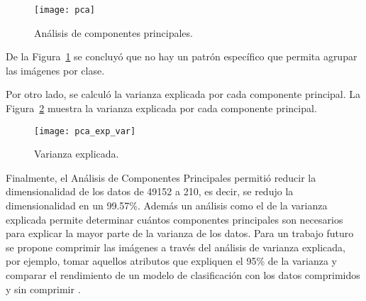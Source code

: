\documentclass{article}
\begin{document}
\begin{figure}[H]
  \centering
  \texttt{[image: pca]}
  \caption{Análisis de componentes principales.}
  \label{fig:pca}
\end{figure}

De la Figura~\ref{fig:pca} se concluyó que no hay un patrón específico que permita agrupar las imágenes por clase.

Por otro lado, se calculó la varianza explicada por cada componente principal. La Figura~\ref{fig:pca_exp_var} muestra la varianza explicada por cada componente principal.

\begin{figure}[H]
  \centering
  \texttt{[image: pca\_exp\_var]}\rule[-0cm]{0cm}{0cm}
  \caption{Varianza explicada.}
  \label{fig:pca_exp_var}
\end{figure}

Finalmente, el Análisis de Componentes Principales permitió reducir la dimensionalidad de los datos de 49152 a 210, es decir, se redujo la dimensionalidad en un 99.57\%. Además un análisis como el de la varianza explicada permite determinar cuántos componentes principales son necesarios para explicar la mayor parte de la varianza de los datos. Para un trabajo futuro se propone comprimir las imágenes a través del análisis de varianza explicada, por ejemplo, tomar aquellos atributos que expliquen el 95\% de la varianza y comparar el rendimiento de un modelo de clasificación con los datos comprimidos y sin comprimir \cite{KagglePCA}.

\medskip

{
\small


}



\end{document}
